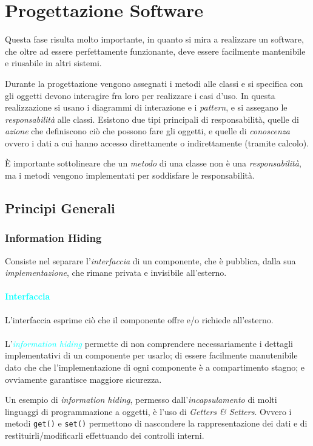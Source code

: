 \newpage

\section{Progettazione Software}
Questa fase risulta molto importante, in quanto si mira a realizzare un software,
che oltre ad essere perfettamente funzionante, deve essere facilmente mantenibile e riusabile in altri sistemi.

Durante la progettazione vengono assegnati i metodi alle classi e si specifica con gli oggetti devono
interagire fra loro per realizzare i casi d'uso. In questa realizzazione si usano i diagrammi di interazione e i \emph{pattern},
e si assegano le \emph{responsabilità} alle classi. Esistono due tipi principali di
responsabilità, quelle di \emph{azione} che definiscono ciò che possono fare gli oggetti, e quelle di \emph{conoscenza} ovvero i dati
a cui hanno accesso direttamente o indirettamente (tramite calcolo).

È importante sottolineare che un \emph{metodo} di una classe non è una \emph{responsabilità}, ma i metodi
vengono implementati per soddisfare le responsabilità.

\subsection{Principi Generali}

\subsubsection{Information Hiding}
Consiste nel separare l'\emph{interfaccia} di un componente, che è pubblica, dalla sua \emph{implementazione},
che rimane privata e invisibile all'esterno.

\paragraph{\textcolor{cyan}{Interfaccia}} L'interfaccia esprime
ciò che il componente offre e/o richiede all'esterno. \\ \\
L'\emph{\textcolor{cyan}{information hiding}} permette di non comprendere necessariamente i dettagli implementativi
di un componente per usarlo; di essere facilmente manutenibile dato che che l'implementazione di ogni componente è a compartimento
stagno; e ovviamente garantisce maggiore sicurezza.

Un esempio di \emph{information hiding}, permesso dall'\emph{incapsulamento} di molti linguaggi di programmazione
a oggetti, è l'uso di \emph{Getters \& Setters}. Ovvero i metodi \verb|get()| e \verb|set()| permettono di nascondere
la rappresentazione dei dati e di restituirli/modificarli effettuando dei controlli interni.


